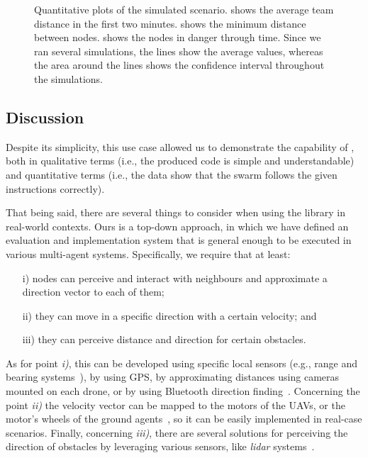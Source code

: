 \begin{figure}[t]
\begin{subfigure}{0.4\textwidth}
  \caption{}
  \label{coordination2023-macro:fig:danger}
\end{subfigure}
\caption[Quantitative plots of the simulated scenario in \MacroSwarm{}.]{
  Quantitative plots of the simulated scenario. 
   shows the average team distance in the first two minutes. 
   shows the minimum distance between nodes. 
   shows the nodes in danger through time. 
  Since we ran several simulations, 
   the lines show the average values, whereas 
   the area around the lines shows the confidence interval throughout the simulations.
}\label{coordination2023-macro:fig:results}
\end{figure}

\subsection{Discussion}\label{coordination2023-macro:subsec:discussion}
%
Despite its simplicity, 
 this use case allowed us to demonstrate the capability of \MacroSwarm{}, 
 both in qualitative terms (i.e., the produced code is simple and understandable) 
 and quantitative terms (i.e., the data show that the swarm follows the given instructions correctly).

That being said, 
 there are several things to consider when using the library in real-world contexts. 
 Ours is a top-down approach, in which we have defined an evaluation and implementation system that is general enough to be executed in various multi-agent systems. 
 Specifically, we require that at least: 
\begin{enumerate}
  \item[i)] nodes can perceive and interact with neighbours and approximate a direction vector to each of them;  
  \item[ii)] they can move in a specific direction with a certain velocity; and  
  \item[iii)] they can perceive distance and direction for certain obstacles.
\end{enumerate} 
%
As for point \emph{i)}, 
 this can be developed using specific local sensors 
 (e.g., range and bearing systems~\cite{DBLP:conf/antsw/BilalogluSAST22}),
 by using GPS, by approximating distances using cameras mounted on each drone, or by using Bluetooth direction finding~\cite{DBLP:conf/wcnc/SambuW22}.
% 
Concerning the point \emph{ii)} the velocity vector can be mapped to the motors of the UAVs, or the motor's wheels of the ground agents~\cite{DBLP:conf/icra/KorenB91}, 
 so it can be easily implemented in real-case scenarios.
%
Finally, concerning \emph{iii)}, 
 there are several solutions for perceiving the direction of obstacles by leveraging various sensors, 
 like \emph{\ac{lidar}} systems~\cite{DBLP:conf/icinfa/PengQZXLG15}.

